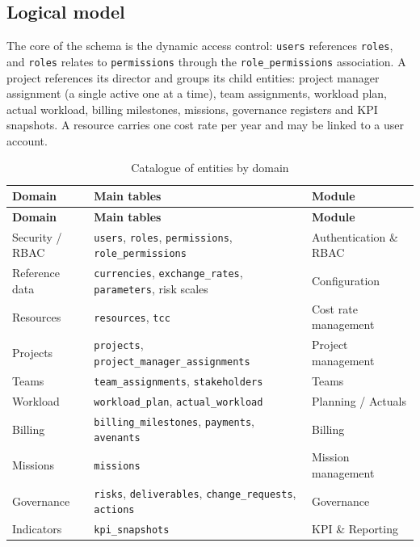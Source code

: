 \subsection{Logical model}
The core of the schema is the dynamic access control: \texttt{users} references \texttt{roles}, and
\texttt{roles} relates to \texttt{permissions} through the \texttt{role\_permissions} association.
A project references its director and groups its child entities: project manager assignment (a
single active one at a time), team assignments, workload plan, actual workload, billing milestones,
missions, governance registers and KPI snapshots. A resource carries one cost rate per year and may
be linked to a user account.

\begin{longtable}{|m{3.6cm}|m{7.4cm}|m{3.4cm}|}
\caption{Catalogue of entities by domain}\label{tab:entities}\\
\hline
\textbf{Domain} & \textbf{Main tables} & \textbf{Module} \\
\hline
\endfirsthead
\hline
\textbf{Domain} & \textbf{Main tables} & \textbf{Module} \\
\hline
\endhead
\endfoot
\endlastfoot
\hline
Security / RBAC & \texttt{users}, \texttt{roles}, \texttt{permissions},
\texttt{role\_permissions} & Authentication \& RBAC \\
\hline
Reference data & \texttt{currencies}, \texttt{exchange\_rates}, \texttt{parameters}, risk scales &
Configuration \\
\hline
Resources & \texttt{resources}, \texttt{tcc} & Cost rate management \\
\hline
Projects & \texttt{projects}, \texttt{project\_manager\_assignments} & Project management \\
\hline
Teams & \texttt{team\_assignments}, \texttt{stakeholders} & Teams \\
\hline
Workload & \texttt{workload\_plan}, \texttt{actual\_workload} & Planning / Actuals \\
\hline
Billing & \texttt{billing\_milestones}, \texttt{payments}, \texttt{avenants} & Billing \\
\hline
Missions & \texttt{missions} & Mission management \\
\hline
Governance & \texttt{risks}, \texttt{deliverables}, \texttt{change\_requests}, \texttt{actions} &
Governance \\
\hline
Indicators & \texttt{kpi\_snapshots} & KPI \& Reporting \\
\hline
\end{longtable}

